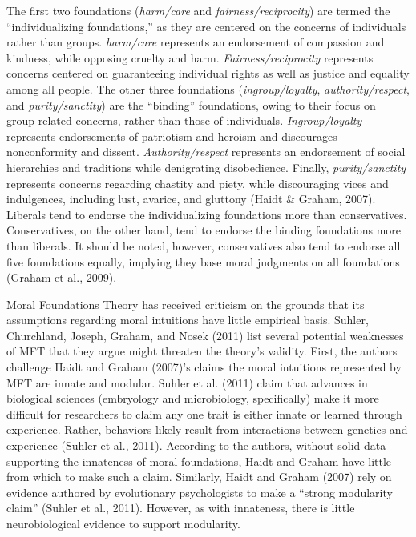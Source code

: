 \documentclass[english,,man]{apa6}
\begin{document}
The first two foundations (\emph{harm/care} and \emph{fairness/reciprocity}) are termed the \enquote{individualizing foundations,} as they are centered on the concerns of individuals rather than groups. \emph{harm/care} represents an endorsement of compassion and kindness, while opposing cruelty and harm. \emph{Fairness/reciprocity} represents concerns centered on guaranteeing individual rights as well as justice and equality among all people. The other three foundations (\emph{ingroup/loyalty}, \emph{authority/respect}, and \emph{purity/sanctity}) are the \enquote{binding} foundations, owing to their focus on group-related concerns, rather than those of individuals. \emph{Ingroup/loyalty} represents endorsements of patriotism and heroism and discourages nonconformity and dissent. \emph{Authority/respect} represents an endorsement of social hierarchies and traditions while denigrating disobedience. Finally, \emph{purity/sanctity} represents concerns regarding chastity and piety, while discouraging vices and indulgences, including lust, avarice, and gluttony (Haidt \& Graham, 2007). Liberals tend to endorse the individualizing foundations more than conservatives. Conservatives, on the other hand, tend to endorse the binding foundations more than liberals. It should be noted, however, conservatives also tend to endorse all five foundations equally, implying they base moral judgments on all foundations (Graham et al., 2009).

Moral Foundations Theory has received criticism on the grounds that its assumptions regarding moral intuitions have little empirical basis. Suhler, Churchland, Joseph, Graham, and Nosek (2011) list several potential weaknesses of MFT that they argue might threaten the theory's validity. First, the authors challenge Haidt and Graham (2007)'s claims the moral intuitions represented by MFT are innate and modular. Suhler et al. (2011) claim that advances in biological sciences (embryology and microbiology, specifically) make it more difficult for researchers to claim any one trait is either innate or learned through experience. Rather, behaviors likely result from interactions between genetics and experience (Suhler et al., 2011). According to the authors, without solid data supporting the innateness of moral foundations, Haidt and Graham have little from which to make such a claim. Similarly, Haidt and Graham (2007) rely on evidence authored by evolutionary psychologists to make a \enquote{strong modularity claim} (Suhler et al., 2011). However, as with innateness, there is little neurobiological evidence to support modularity.
\end{document}
